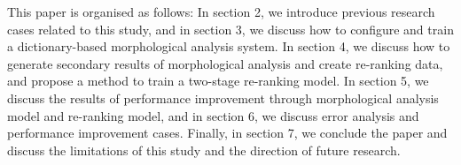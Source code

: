 \documentclass[AMS,STIX2COL]{WileyNJD-v2}
\begin{document}

    This paper is organised as follows:
    In section 2, we introduce previous research cases related to this study, and in section 3, we discuss how to configure and train a dictionary-based morphological analysis system.
    In section 4, we discuss how to generate secondary results of morphological analysis and create re-ranking data, and propose a method to train a two-stage re-ranking model.
    In section 5, we discuss the results of performance improvement through morphological analysis model and re-ranking model, and in section 6, we discuss error analysis and performance improvement cases.
    Finally, in section 7, we conclude the paper and discuss the limitations of this study and the direction of future research.

\end{document}
